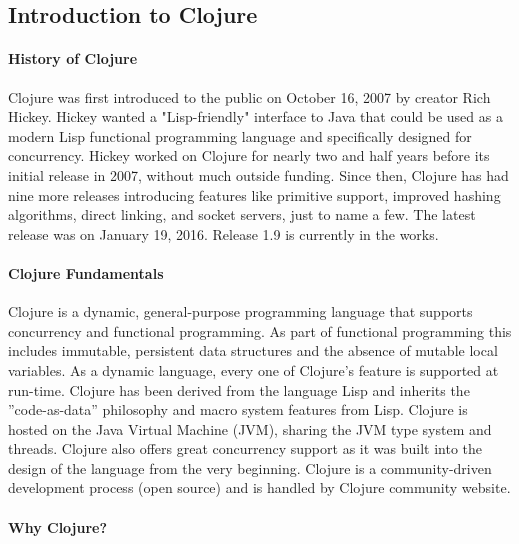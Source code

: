\subsection{Introduction to Clojure}

\paragraph{History of Clojure}
    
    Clojure was first introduced to the public on October 16, 2007 by creator Rich Hickey. Hickey wanted a "Lisp-friendly" interface to Java that could be used as a modern Lisp functional programming language and specifically designed for concurrency. Hickey worked on Clojure for nearly two and half years before its initial release in 2007, without much outside funding. Since then, Clojure has had nine more releases introducing features like primitive support, improved hashing algorithms, direct linking, and socket servers, just to name a few. The latest release was on January 19, 2016. Release 1.9 is currently in the works.
    \cite{ClojureHistory_GitHub_Website}
    
    
\paragraph{Clojure Fundamentals}
    
    Clojure is a dynamic, general-purpose programming language that supports concurrency and functional programming. As part of functional programming this includes immutable, persistent data structures and the absence of mutable local variables. As a dynamic language, every one of Clojure's feature is supported at run-time. Clojure has been derived from the language Lisp and inherits the ''code-as-data'' philosophy and macro system features from Lisp. Clojure is hosted on the Java Virtual Machine (JVM), sharing the JVM type system and threads. Clojure also offers great concurrency support as it was built into the design of the language from the very beginning. Clojure is a community-driven development process (open source) and is handled by Clojure community website.  
    \cite{ClojureConcurrencySupport_Slides_Hickey}
    
\paragraph{Why Clojure?}
   
